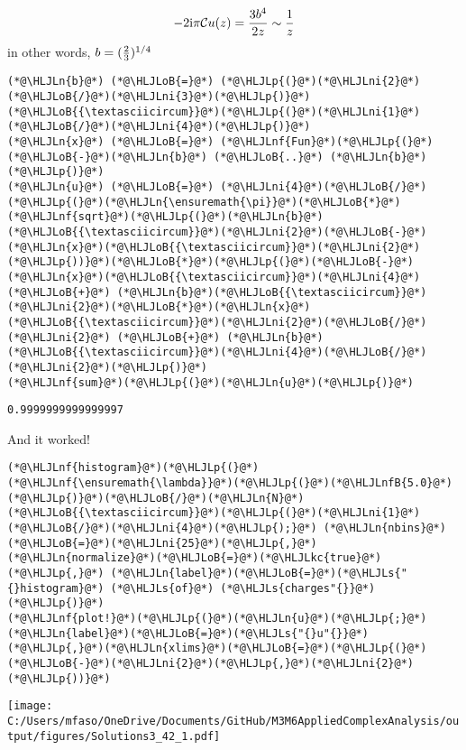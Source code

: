 \documentclass[12pt,landscape]{article}
\newcommand{\HLJLkc}[1]{\textcolor[RGB]{59,151,46}{\textit{#1}}}
\newcommand{\HLJLn}[1]{#1}
\newcommand{\HLJLnf}[1]{\textcolor[RGB]{66,102,213}{#1}}
\newcommand{\HLJLs}[1]{\textcolor[RGB]{201,61,57}{#1}}
\newcommand{\HLJLnfB}[1]{\textcolor[RGB]{59,151,46}{#1}}
\newcommand{\HLJLni}[1]{\textcolor[RGB]{59,151,46}{#1}}
\newcommand{\HLJLoB}[1]{\textcolor[RGB]{102,102,102}{\textbf{#1}}}
\newcommand{\HLJLp}[1]{#1}
\def\I{ {\rm i} }
\def\CC{ {\cal C} }
\begin{document}
{\[
-2\I\pi \CC u(z) = {3 b^4 \over 2 z} \sim {1 \over z}
\]
in other words, $b = ({2 \over 3})^{1/4}$


\begin{lstlisting}
(*@\HLJLn{b}@*) (*@\HLJLoB{=}@*) (*@\HLJLp{(}@*)(*@\HLJLni{2}@*)(*@\HLJLoB{/}@*)(*@\HLJLni{3}@*)(*@\HLJLp{)}@*)(*@\HLJLoB{{\textasciicircum}}@*)(*@\HLJLp{(}@*)(*@\HLJLni{1}@*)(*@\HLJLoB{/}@*)(*@\HLJLni{4}@*)(*@\HLJLp{)}@*)
(*@\HLJLn{x}@*) (*@\HLJLoB{=}@*) (*@\HLJLnf{Fun}@*)(*@\HLJLp{(}@*)(*@\HLJLoB{-}@*)(*@\HLJLn{b}@*) (*@\HLJLoB{..}@*) (*@\HLJLn{b}@*)(*@\HLJLp{)}@*)
(*@\HLJLn{u}@*) (*@\HLJLoB{=}@*) (*@\HLJLni{4}@*)(*@\HLJLoB{/}@*)(*@\HLJLp{(}@*)(*@\HLJLn{\ensuremath{\pi}}@*)(*@\HLJLoB{*}@*)(*@\HLJLnf{sqrt}@*)(*@\HLJLp{(}@*)(*@\HLJLn{b}@*)(*@\HLJLoB{{\textasciicircum}}@*)(*@\HLJLni{2}@*)(*@\HLJLoB{-}@*)(*@\HLJLn{x}@*)(*@\HLJLoB{{\textasciicircum}}@*)(*@\HLJLni{2}@*)(*@\HLJLp{))}@*)(*@\HLJLoB{*}@*)(*@\HLJLp{(}@*)(*@\HLJLoB{-}@*)(*@\HLJLn{x}@*)(*@\HLJLoB{{\textasciicircum}}@*)(*@\HLJLni{4}@*) (*@\HLJLoB{+}@*) (*@\HLJLn{b}@*)(*@\HLJLoB{{\textasciicircum}}@*)(*@\HLJLni{2}@*)(*@\HLJLoB{*}@*)(*@\HLJLn{x}@*)(*@\HLJLoB{{\textasciicircum}}@*)(*@\HLJLni{2}@*)(*@\HLJLoB{/}@*)(*@\HLJLni{2}@*) (*@\HLJLoB{+}@*) (*@\HLJLn{b}@*)(*@\HLJLoB{{\textasciicircum}}@*)(*@\HLJLni{4}@*)(*@\HLJLoB{/}@*)(*@\HLJLni{2}@*)(*@\HLJLp{)}@*)
(*@\HLJLnf{sum}@*)(*@\HLJLp{(}@*)(*@\HLJLn{u}@*)(*@\HLJLp{)}@*)
\end{lstlisting}

\begin{lstlisting}
0.9999999999999997
\end{lstlisting}


And it worked!


\begin{lstlisting}
(*@\HLJLnf{histogram}@*)(*@\HLJLp{(}@*)(*@\HLJLnf{\ensuremath{\lambda}}@*)(*@\HLJLp{(}@*)(*@\HLJLnfB{5.0}@*)(*@\HLJLp{)}@*)(*@\HLJLoB{/}@*)(*@\HLJLn{N}@*)(*@\HLJLoB{{\textasciicircum}}@*)(*@\HLJLp{(}@*)(*@\HLJLni{1}@*)(*@\HLJLoB{/}@*)(*@\HLJLni{4}@*)(*@\HLJLp{);}@*) (*@\HLJLn{nbins}@*)(*@\HLJLoB{=}@*)(*@\HLJLni{25}@*)(*@\HLJLp{,}@*) (*@\HLJLn{normalize}@*)(*@\HLJLoB{=}@*)(*@\HLJLkc{true}@*)(*@\HLJLp{,}@*) (*@\HLJLn{label}@*)(*@\HLJLoB{=}@*)(*@\HLJLs{"{}histogram}@*) (*@\HLJLs{of}@*) (*@\HLJLs{charges"{}}@*)(*@\HLJLp{)}@*)
(*@\HLJLnf{plot!}@*)(*@\HLJLp{(}@*)(*@\HLJLn{u}@*)(*@\HLJLp{;}@*) (*@\HLJLn{label}@*)(*@\HLJLoB{=}@*)(*@\HLJLs{"{}u"{}}@*)(*@\HLJLp{,}@*)(*@\HLJLn{xlims}@*)(*@\HLJLoB{=}@*)(*@\HLJLp{(}@*)(*@\HLJLoB{-}@*)(*@\HLJLni{2}@*)(*@\HLJLp{,}@*)(*@\HLJLni{2}@*)(*@\HLJLp{))}@*)
\end{lstlisting}

\texttt{[image: C:/Users/mfaso/OneDrive/Documents/GitHub/M3M6AppliedComplexAnalysis/output/figures/Solutions3\_42\_1.pdf]}

}
\end{document}
